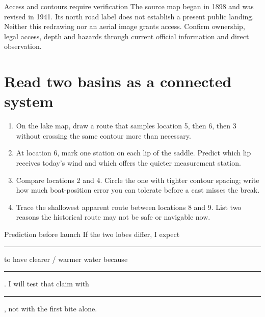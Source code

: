 \begin{teloshazard}{Access and contours require verification}
The source map began in 1898 and was revised in 1941. Its north road label does
not establish a present public landing. Neither this redrawing nor an aerial
image grants access. Confirm ownership, legal access, depth and hazards through
current official information and direct observation.
\end{teloshazard}

\newpage
\section{Read two basins as a connected system}

\begin{center}
\end{center}

\begin{enumerate}
\item On the lake map, draw a route that samples location 5, then 6, then 3
without crossing the same contour more than necessary.
\item At location 6, mark one station on each lip of the saddle. Predict which
lip receives today's wind and which offers the quieter measurement station.
\item Compare locations 2 and 4. Circle the one with tighter contour spacing;
write how much boat-position error you can tolerate before a cast misses the
break.
\item Trace the shallowest apparent route between locations 8 and 9. List two
reasons the historical route may not be safe or navigable now.
\end{enumerate}

\begin{teloscard}{Prediction before launch}
If the two lobes differ, I expect \rule{1.55in}{.4pt} to have clearer /
warmer water because \rule{2.2in}{.4pt}. I will test that claim with
\rule{2in}{.4pt}, not with the first bite alone.
\end{teloscard}

